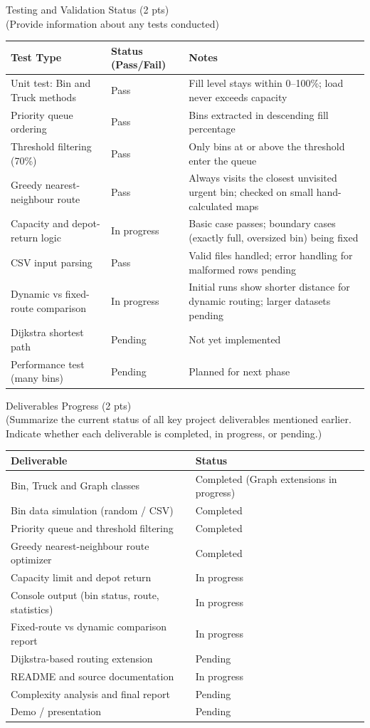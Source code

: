 \documentclass[10pt,a4paper]{article}
\newcommand{\sectionhead}[2]{%
  \needspace{8\baselineskip}
  \vspace{6pt}
  {\Large\color{headblue}#1}\\[-2pt]
  {\small\color{hintgrey}#2}\par\vspace{2pt}}
\newcommand{\hrow}{\rowcolor{tablehead}}
\begin{document}
\sectionhead{Testing and Validation Status (2 pts)}{(Provide information about any tests conducted)}
\noindent
\begin{tabularx}{\textwidth}{|L{0.28\textwidth}|L{0.16\textwidth}|X|}
\hline
\hrow \textbf{Test Type} & \textbf{Status (Pass/Fail)} & \textbf{Notes} \\ \hline
Unit test: Bin and Truck methods & Pass & Fill level stays within 0--100\%; load never exceeds capacity \\ \hline
Priority queue ordering & Pass & Bins extracted in descending fill percentage \\ \hline
Threshold filtering (70\%) & Pass & Only bins at or above the threshold enter the queue \\ \hline
Greedy nearest-neighbour route & Pass & Always visits the closest unvisited urgent bin; checked on small hand-calculated maps \\ \hline
Capacity and depot-return logic & In progress & Basic case passes; boundary cases (exactly full, oversized bin) being fixed \\ \hline
CSV input parsing & Pass & Valid files handled; error handling for malformed rows pending \\ \hline
Dynamic vs fixed-route comparison & In progress & Initial runs show shorter distance for dynamic routing; larger datasets pending \\ \hline
Dijkstra shortest path & Pending & Not yet implemented \\ \hline
Performance test (many bins) & Pending & Planned for next phase \\ \hline
\end{tabularx}



\sectionhead{Deliverables Progress (2 pts)}{(Summarize the current status of all key project deliverables mentioned earlier. Indicate whether each deliverable is completed, in progress, or pending.)}
\noindent
\begin{tabularx}{\textwidth}{|X|L{0.36\textwidth}|}
\hline
\hrow \textbf{Deliverable} & \textbf{Status} \\ \hline
Bin, Truck and Graph classes & Completed (Graph extensions in progress) \\ \hline
Bin data simulation (random / CSV) & Completed \\ \hline
Priority queue and threshold filtering & Completed \\ \hline
Greedy nearest-neighbour route optimizer & Completed \\ \hline
Capacity limit and depot return & In progress \\ \hline
Console output (bin status, route, statistics) & In progress \\ \hline
Fixed-route vs dynamic comparison report & In progress \\ \hline
Dijkstra-based routing extension & Pending \\ \hline
README and source documentation & In progress \\ \hline
Complexity analysis and final report & Pending \\ \hline
Demo / presentation & Pending \\ \hline
\end{tabularx}
\end{document}
